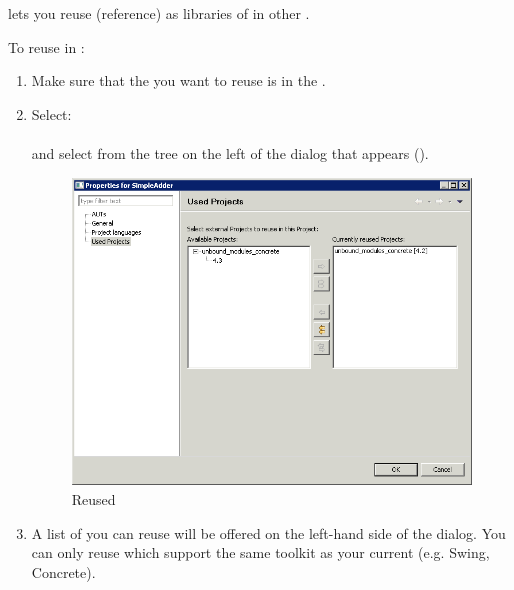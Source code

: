 \app{} lets you reuse (reference) \gdprojects{} as libraries of \gdcases{} in other \gdprojects{}. 

To reuse \gdprojects{} in \app{}:
\begin{enumerate}
\item Make sure that the \gdproject{} you want to reuse is in the \gddb{}.
\item Select:\\
\\
and select  from the tree on the left of the dialog that appears ().

\begin{figure}[h]
\begin{center}
\includegraphics[width=12.5cm]{Tasks/Projects/PS/reuseproject}
\caption{Reused \gdprojects{}}
\label{reuseproject}
\end{center}
\end{figure}

\item A list of \gdprojects{} you can reuse will be offered on the left-hand side of the dialog. You can only reuse \gdprojects{} which support the same toolkit as your current \gdproject{} (e.g. Swing, Concrete).


\end{enumerate}
